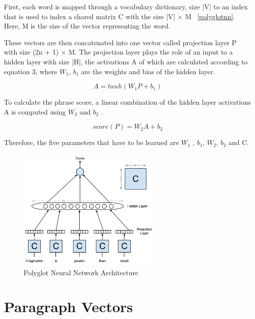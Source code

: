 First, each word is mapped through a vocabulary dictionary, size |V| to an index that is used to index a shared matrix C with the size |V| $\times$ M ~\autoref{polyglotnn}. Here, M is the size of the vector representing the word. 

These vectors are then concatenated into one vector called projection layer P with size (2n + 1) $\times$ M. The projection layer plays the role of an input to a hidden layer with size |H|, the activations A of which are calculated according to equation 3, where ${W}_{1}$, ${b}_{1}$ are the weights and bias of the hidden layer. 

\begin{equation} \label{eq:polyglot2}
A = tanh({W}_{1}P +  {b}_{1}) 
\end{equation}

To calculate the phrase score, a linear combination of the hidden layer activations A is computed using ${W}_{2}$ and ${b}_{2}$ .

\begin{equation} \label{eq:polyglot3}
score(P) = {W}_{2}A + {b}_{2} 
\end{equation}

Therefore, the five parameters that have to be learned are ${W}_{1}$ , ${b}_{1}$, ${W}_{2}$, ${b}_{2}$ and C.

\begin{figure}[ht!]
	\centering
		\includegraphics[height=60mm,  width=70mm]{figures/4_polyglotnn.png}
		\caption[Polyglot Neural Network Architecture]{Polyglot Neural Network Architecture}
			\label{polyglotnn}
\end{figure}

\section{Paragraph Vectors}

